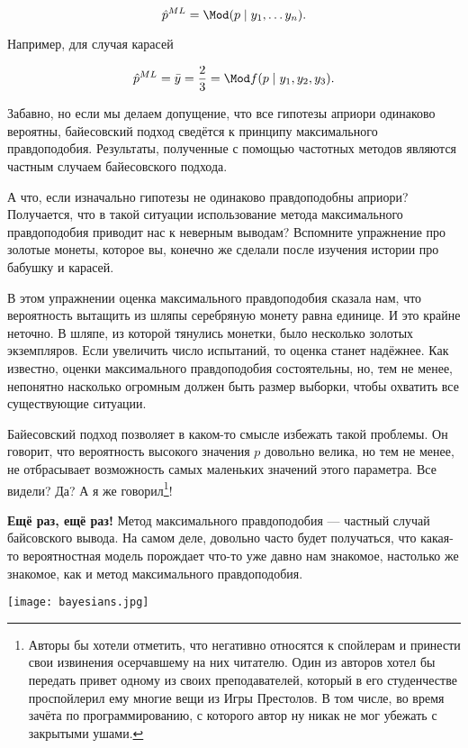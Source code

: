 \[\hat p^{ML} = \Mod(p \mid y_1, \ldots y_n). \]

Например, для случая карасей

\[ \hat p^{ML} = \bar{y} = \frac{2}{3} = \Mod f(p \mid y_1,y_2,y_3). \]

Забавно, но если мы делаем допущение, что все гипотезы априори одинаково вероятны, байесовский подход сведётся к принципу максимального правдоподобия. Результаты, полученные с помощью частотных методов являются частным случаем байесовского подхода. 

А что, если изначально гипотезы не одинаково правдоподобны априори? Получается, что в такой ситуации использование метода максимального правдоподобия приводит нас к неверным выводам? Вспомните упражнение про золотые монеты, которое вы, конечно же сделали после изучения истории про бабушку и карасей.

В этом упражнении оценка максимального правдоподобия сказала нам, что вероятность вытащить из шляпы серебряную монету равна единице. И это крайне неточно. В шляпе, из которой тянулись монетки, было несколько золотых экземпляров. Если увеличить число испытаний, то оценка станет надёжнее. Как известно, оценки максимального правдоподобия состоятельны, но, тем не менее, непонятно насколько огромным должен быть размер выборки, чтобы охватить все существующие ситуации. 

Байесовский подход позволяет в каком-то смысле избежать такой проблемы. Он говорит, что вероятность высокого значения $p$ довольно велика, но тем не менее, не отбрасывает возможность самых маленьких значений этого параметра.  Все видели? Да? А я же говорил\footnote{Авторы бы хотели отметить, что негативно относятся к спойлерам и принести свои извинения осерчавшему на них читателю. Один из авторов хотел бы передать привет одному из своих преподавателей, который в его студенчестве проспойлерил ему многие вещи из Игры Престолов. В том числе, во время зачёта по программированию, с которого автор ну никак не мог убежать с закрытыми ушами.}!

\textbf{Ещё раз, ещё раз!} Метод максимального правдоподобия --- частный случай байсовского вывода. На самом деле, довольно часто будет получаться, что какая-то вероятностная модель порождает что-то уже давно нам знакомое, настолько же знакомое, как и метод максимального правдоподобия. 

\begin{center}
\texttt{[image: bayesians.jpg]}
\end{center} 

